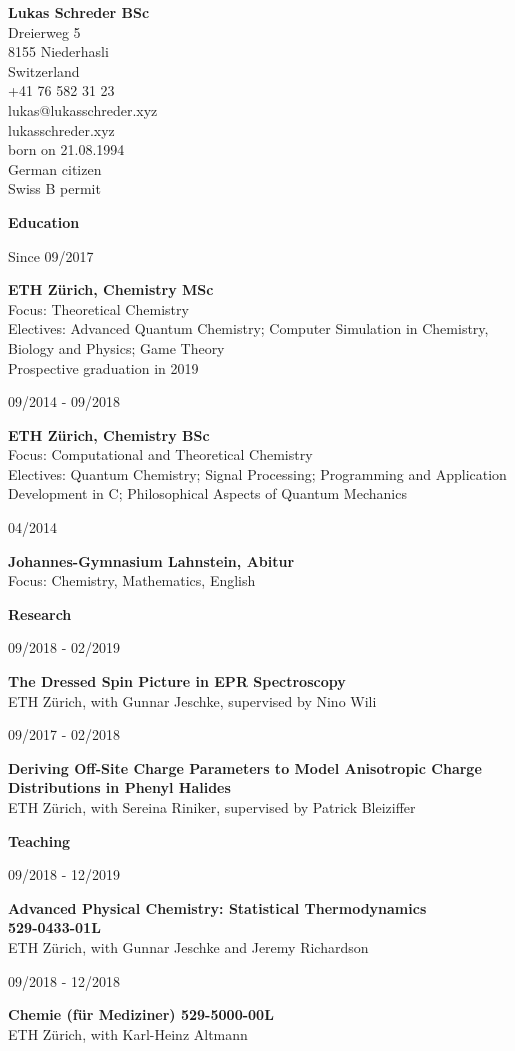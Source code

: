 \documentclass{article}
\makeatletter
\def \name {Lukas Schreder BSc}
\def \street {Dreierweg 5}
\def \town {8155 Niederhasli}
\def \country {Switzerland}
\def \phone {+41 76 582 31 23}
\def \email {lukas@lukasschreder.xyz}
\def \homepage {lukasschreder.xyz}
\def \dob {21.08.1994}
\def \citizenship {German citizen}
\def \permit {Swiss B permit}
\renewcommand*{\maketitle}[1]{\def\@title{#1}}
\renewcommand{\maketitle}{
  \newpage
  \begin{minipage}[t]{.5\linewidth}
    \begin{flushleft}
      {\bfseries \large \name \\}
      \street \\
      \town \\
      \country \\
      \phone \\
      \email \\
      \homepage \\
      \bigskip
      born on \dob \\
      \citizenship \\
      \permit
    \end{flushleft}
  \end{minipage}

  \begin{minipage}[t]{.5\linewidth}
    \raggedleft
  \end{minipage}
}
\newcommand{\cventry}[3]{
  \begin{minipage}[t]{.24\linewidth}
    \begin{flushright}
      #1
    \end{flushright}
  \end{minipage}
  \hspace{\fill}
  \begin{minipage}[t]{.70\linewidth}
    \textbf{#2}\\
    #3 
  \end{minipage}
  \vspace{1.5em}
}
\renewcommand{\section}[1]{
  \vspace{2em}

  \begin{minipage}[t]{.24\linewidth}
  \end{minipage}
  \hspace{\fill}
  \begin{minipage}[t]{.70\linewidth}
    {\raggedright \bfseries \Large#1}
  \end{minipage}
  \vspace{1.5em}
}
\makeatother
\begin{document}
\maketitle

\section{Education}

\cventry{Since 09/2017}
        {ETH Z\"urich, Chemistry MSc}
        {Focus: Theoretical Chemistry \\
         Electives: Advanced Quantum Chemistry; Computer Simulation in Chemistry, Biology and Physics; Game Theory \\
         Prospective graduation in 2019}

\cventry{09/2014 - 09/2018}
        {ETH Z\"urich, Chemistry BSc}
        {Focus: Computational and Theoretical Chemistry \\
         Electives: Quantum Chemistry; Signal Processing; Programming and Application Development in C\plus\plus; Philosophical Aspects of Quantum Mechanics}

\cventry{04/2014}
        {Johannes-Gymnasium Lahnstein, Abitur}
        {Focus: Chemistry, Mathematics, English}


\section{Research}

\cventry{09/2018 - 02/2019}
        {The Dressed Spin Picture in EPR Spectroscopy}
        {ETH Z\"urich, with Gunnar Jeschke, supervised by Nino Wili}

\cventry{09/2017 - 02/2018}
        {Deriving Off-Site Charge Parameters to Model Anisotropic Charge Distributions in Phenyl Halides}
        {ETH Z\"urich, with Sereina Riniker, supervised by Patrick Bleiziffer}


\section{Teaching}

\cventry{09/2018 - 12/2019}
        {Advanced Physical Chemistry: Statistical Thermodynamics\\529-0433-01L}
        {ETH Z\"urich, with Gunnar Jeschke and Jeremy Richardson}

\cventry{09/2018 - 12/2018}
        {Chemie (f\"ur Mediziner) 529-5000-00L} 
        {ETH Z\"urich, with Karl-Heinz Altmann}
        
\end{document}
